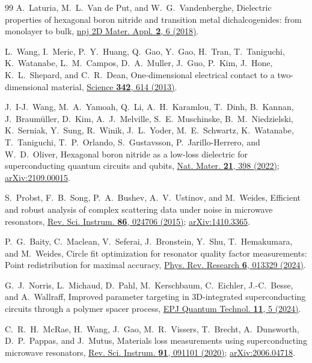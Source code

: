 \documentclass[aps,prb,reprint,superscriptaddress,longbibliography]{revtex4-2}
\begin{document}
\begin{thebibliography}{99}
A.~Laturia, M.~L.~Van de Put, and W.~G.~Vandenberghe, Dielectric
properties of hexagonal boron nitride and transition metal
dichalcogenides: from monolayer to bulk,
\href{https://doi.org/10.1038/s41699-018-0050-x}{npj 2D Mater. Appl.
\textbf{2}, 6 (2018)}.

L.~Wang, I.~Meric, P.~Y.~Huang, Q.~Gao, Y.~Gao, H.~Tran, T.~Taniguchi,
K.~Watanabe, L.~M.~Campos, D.~A.~Muller, J.~Guo, P.~Kim, J.~Hone,
K.~L.~Shepard, and C.~R.~Dean, One-dimensional electrical contact to a
two-dimensional material,
\href{https://doi.org/10.1126/science.1244358}{Science \textbf{342}, 614
(2013)}.

J.~I-J.~Wang, M.~A.~Yamoah, Q.~Li, A.~H.~Karamlou, T.~Dinh, B.~Kannan,
J.~Braum\"uller, D.~Kim, A.~J.~Melville, S.~E.~Muschinske,
B.~M.~Niedzielski, K.~Serniak, Y.~Sung, R.~Winik, J.~L.~Yoder,
M.~E.~Schwartz, K.~Watanabe, T.~Taniguchi, T.~P.~Orlando, S.~Gustavsson,
P.~Jarillo-Herrero, and W.~D.~Oliver, Hexagonal boron nitride as a
low-loss dielectric for superconducting quantum circuits and qubits,
\href{https://doi.org/10.1038/s41563-021-01187-w}{Nat. Mater.
\textbf{21}, 398 (2022)};
\href{https://arxiv.org/abs/2109.00015}{arXiv:2109.00015}.

S.~Probst, F.~B.~Song, P.~A.~Bushev, A.~V.~Ustinov, and M.~Weides,
Efficient and robust analysis of complex scattering data under noise in
microwave resonators,
\href{https://doi.org/10.1063/1.4907935}{Rev. Sci. Instrum. \textbf{86},
024706 (2015)}; \href{https://arxiv.org/abs/1410.3365}{arXiv:1410.3365}.

P.~G.~Baity, C.~Maclean, V.~Seferai, J.~Bronstein, Y.~Shu,
T.~Hemakumara, and M.~Weides, Circle fit optimization for resonator
quality factor measurements: Point redistribution for maximal accuracy,
\href{https://doi.org/10.1103/PhysRevResearch.6.013329}{Phys. Rev.
Research \textbf{6}, 013329 (2024)}.

G.~J.~Norris, L.~Michaud, D.~Pahl, M.~Kerschbaum, C.~Eichler,
J.-C.~Besse, and A.~Wallraff, Improved parameter targeting in
3D-integrated superconducting circuits through a polymer spacer process,
\href{https://doi.org/10.1140/epjqt/s40507-023-00213-x}{EPJ Quantum
Technol. \textbf{11}, 5 (2024)}.

C.~R.~H.~McRae, H.~Wang, J.~Gao, M.~R.~Vissers, T.~Brecht,
A.~Dunsworth, D.~P.~Pappas, and J.~Mutus, Materials loss measurements
using superconducting microwave resonators,
\href{https://doi.org/10.1063/5.0017378}{Rev. Sci. Instrum. \textbf{91},
091101 (2020)}; \href{https://arxiv.org/abs/2006.04718}{arXiv:2006.04718}.


\end{thebibliography}
\end{document}
